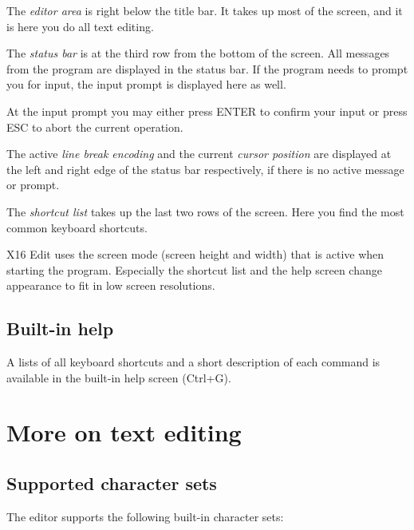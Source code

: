 \documentclass{article}
\begin{document}
        The \textit{editor area} is right below the title bar. It takes up most of the screen, and
        it is here you do all text editing.

        The \textit{status bar} is at the third row from the bottom of the screen. All messages
        from the program are displayed in the status bar. If the program needs to prompt you
        for input, the input prompt is displayed here as well. 
        
        At the input prompt you may either press ENTER to confirm your input or press ESC 
        to abort the current operation.

        The active \textit{line break encoding} and the current \textit{cursor position} are displayed at the left and right edge of the status bar respectively, if
        there is no active message or prompt.

        The \textit{shortcut list} takes up the last two rows of the screen. Here you find
        the most common keyboard shortcuts.
        
        X16 Edit uses the screen mode (screen height and width) that is active when starting
        the program. Especially the shortcut list and the help screen change appearance to fit in 
        low screen resolutions.

    \subsection{Built-in help}
        A lists of all keyboard shortcuts and a short description 
        of each command is available in the built-in help screen (Ctrl+G). 
    
\section{More on text editing}

    \subsection{Supported character sets}
        The editor supports the following built-in character sets:
\end{document}
